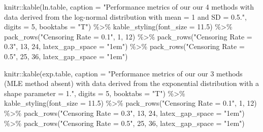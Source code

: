 \documentclass[12pt, twoside]{amherstthesis}
\newenvironment{Shaded}{\begin{snugshade}}{\end{snugshade}}
\newcommand{\AttributeTok}[1]{\textcolor[rgb]{0.77,0.63,0.00}{#1}}
\newcommand{\DecValTok}[1]{\textcolor[rgb]{0.00,0.00,0.81}{#1}}
\newcommand{\FloatTok}[1]{\textcolor[rgb]{0.00,0.00,0.81}{#1}}
\newcommand{\FunctionTok}[1]{\textcolor[rgb]{0.00,0.00,0.00}{#1}}
\newcommand{\NormalTok}[1]{#1}
\newcommand{\SpecialCharTok}[1]{\textcolor[rgb]{0.00,0.00,0.00}{#1}}
\newcommand{\StringTok}[1]{\textcolor[rgb]{0.31,0.60,0.02}{#1}}
\begin{document}
\begin{Shaded}
\begin{Highlighting}[]
\NormalTok{knitr}\SpecialCharTok{::}\FunctionTok{kable}\NormalTok{(ln.table, }\AttributeTok{caption =} \StringTok{"Performance metrics of our our }
\StringTok{             4 methods with data derived from the log{-}normal }
\StringTok{             distribution with mean = 1 and SD = 0.5."}\NormalTok{, }
             \AttributeTok{digits =} \DecValTok{5}\NormalTok{, }\AttributeTok{booktabs =} \StringTok{"T"}\NormalTok{) }\SpecialCharTok{\%\textgreater{}\%}
  \FunctionTok{kable\_styling}\NormalTok{(}\AttributeTok{font\_size =} \FloatTok{11.5}\NormalTok{) }\SpecialCharTok{\%\textgreater{}\%}
  \FunctionTok{pack\_rows}\NormalTok{(}\StringTok{"Censoring Rate = 0.1"}\NormalTok{, }\DecValTok{1}\NormalTok{, }\DecValTok{12}\NormalTok{) }\SpecialCharTok{\%\textgreater{}\%}
  \FunctionTok{pack\_rows}\NormalTok{(}\StringTok{"Censoring Rate = 0.3"}\NormalTok{, }\DecValTok{13}\NormalTok{, }\DecValTok{24}\NormalTok{, }\AttributeTok{latex\_gap\_space =} \StringTok{"1em"}\NormalTok{) }\SpecialCharTok{\%\textgreater{}\%}
  \FunctionTok{pack\_rows}\NormalTok{(}\StringTok{"Censoring Rate = 0.5"}\NormalTok{, }\DecValTok{25}\NormalTok{, }\DecValTok{36}\NormalTok{, }\AttributeTok{latex\_gap\_space =} \StringTok{"1em"}\NormalTok{)}
\end{Highlighting}
\end{Shaded}
\begin{Shaded}
\begin{Highlighting}[]
\NormalTok{knitr}\SpecialCharTok{::}\FunctionTok{kable}\NormalTok{(exp.table, }\AttributeTok{caption =} \StringTok{"Performance metrics of our our 3 }
\StringTok{             methods (MLE method absent) with data derived from the }
\StringTok{             exponential distribution with a shape parameter = 1."}\NormalTok{, }
             \AttributeTok{digits =} \DecValTok{5}\NormalTok{, }\AttributeTok{booktabs =} \StringTok{"T"}\NormalTok{) }\SpecialCharTok{\%\textgreater{}\%}
  \FunctionTok{kable\_styling}\NormalTok{(}\AttributeTok{font\_size =} \FloatTok{11.5}\NormalTok{) }\SpecialCharTok{\%\textgreater{}\%}
  \FunctionTok{pack\_rows}\NormalTok{(}\StringTok{"Censoring Rate = 0.1"}\NormalTok{, }\DecValTok{1}\NormalTok{, }\DecValTok{12}\NormalTok{) }\SpecialCharTok{\%\textgreater{}\%}
  \FunctionTok{pack\_rows}\NormalTok{(}\StringTok{"Censoring Rate = 0.3"}\NormalTok{, }\DecValTok{13}\NormalTok{, }\DecValTok{24}\NormalTok{, }\AttributeTok{latex\_gap\_space =} \StringTok{"1em"}\NormalTok{) }\SpecialCharTok{\%\textgreater{}\%}
  \FunctionTok{pack\_rows}\NormalTok{(}\StringTok{"Censoring Rate = 0.5"}\NormalTok{, }\DecValTok{25}\NormalTok{, }\DecValTok{36}\NormalTok{, }\AttributeTok{latex\_gap\_space =} \StringTok{"1em"}\NormalTok{)}
\end{Highlighting}
\end{Shaded}
\end{document}
